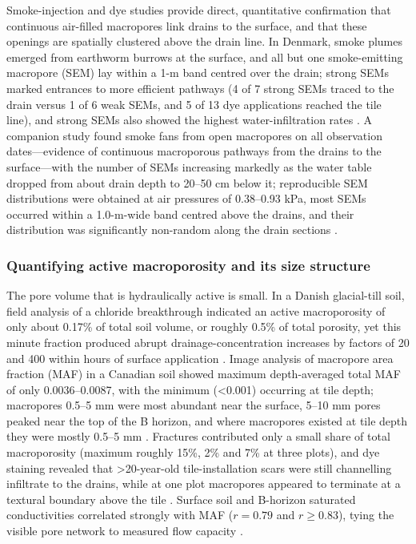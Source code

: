 Smoke-injection and dye studies provide direct, quantitative confirmation that
continuous air-filled macropores link drains to the surface, and that these openings
are spatially clustered above the drain line. In Denmark, smoke plumes emerged from
earthworm burrows at the surface, and all but one smoke-emitting macropore (SEM) lay
within a 1-m band centred over the drain; strong SEMs marked entrances to more
efficient pathways (4 of 7 strong SEMs traced to the drain versus 1 of 6 weak SEMs,
and 5 of 13 dye applications reached the tile line), and strong SEMs also showed the
highest water-infiltration rates \parencite{Nielsen2015}. A companion study found
smoke fans from open macropores on all observation dates---evidence of continuous
macroporous pathways from the drains to the surface---with the number of SEMs
increasing markedly as the water table dropped from about drain depth to 20--50 cm
below it; reproducible SEM distributions were obtained at air pressures of 0.38--0.93
kPa, most SEMs occurred within a 1.0-m-wide band centred above the drains, and their
distribution was significantly non-random along the drain sections
\parencite{Petersen2012}.

\subsubsection{Quantifying active macroporosity and its size structure}

The pore volume that is hydraulically active is small. In a Danish glacial-till soil,
field analysis of a chloride breakthrough indicated an active macroporosity of only
about 0.17\% of total soil volume, or roughly 0.5\% of total porosity, yet this
minute fraction produced abrupt drainage-concentration increases by factors of 20 and
400 within hours of surface application \parencite{Villholth1998}. Image analysis of
macropore area fraction (MAF) in a Canadian soil showed maximum depth-averaged total
MAF of only 0.0036--0.0087, with the minimum (\textless 0.001) occurring at tile
depth; macropores 0.5--5 mm were most abundant near the surface, 5--10 mm pores
peaked near the top of the B horizon, and where macropores existed at tile depth they
were mostly 0.5--5 mm \parencite{Frey2011}. Fractures contributed only a small share
of total macroporosity (maximum roughly 15\%, 2\% and 7\% at three plots), and
dye staining revealed that \textgreater 20-year-old tile-installation scars were
still channelling infiltrate to the drains, while at one plot macropores appeared to
terminate at a textural boundary above the tile \parencite{Frey2011}. Surface soil
and B-horizon saturated conductivities correlated strongly with MAF ($r = 0.79$ and
$r \geq 0.83$), tying the visible pore network to measured flow capacity
\parencite{Frey2011}.

